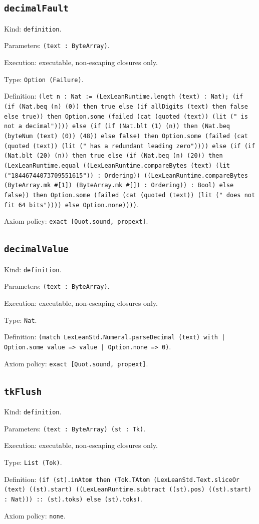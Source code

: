 \documentclass[11pt]{article}
\begin{document}
\subsection*{\texttt{decimalFault}}
\noindent Kind: \texttt{definition}.\par
\noindent Parameters: \texttt{(text : ByteArray)}.\par
\noindent Execution: executable, non-escaping closures only.\par
\noindent Type: \texttt{Option (Failure)}.\par
\noindent Definition: \texttt{(let n : Nat := (LexLeanRuntime.length (text) : Nat); (if (if (Nat.beq (n) (0)) then true else (if allDigits (text) then false else true)) then Option.some (failed (cat (quoted (text)) (lit (" is not a decimal")))) else (if (if (Nat.blt (1) (n)) then (Nat.beq (byteNum (text) (0)) (48)) else false) then Option.some (failed (cat (quoted (text)) (lit (" has a redundant leading zero")))) else (if (if (Nat.blt (20) (n)) then true else (if (Nat.beq (n) (20)) then (LexLeanRuntime.equal ((LexLeanRuntime.compareBytes (text) (lit ("18446744073709551615")) : Ordering)) ((LexLeanRuntime.compareBytes (ByteArray.mk \#[1]) (ByteArray.mk \#[]) : Ordering)) : Bool) else false)) then Option.some (failed (cat (quoted (text)) (lit (" does not fit 64 bits")))) else Option.none))))}.\par
\noindent Axiom policy: \texttt{exact [Quot.sound, propext]}.\par
\subsection*{\texttt{decimalValue}}
\noindent Kind: \texttt{definition}.\par
\noindent Parameters: \texttt{(text : ByteArray)}.\par
\noindent Execution: executable, non-escaping closures only.\par
\noindent Type: \texttt{Nat}.\par
\noindent Definition: \texttt{(match LexLeanStd.Numeral.parseDecimal (text) with | Option.some value => value | Option.none => 0)}.\par
\noindent Axiom policy: \texttt{exact [Quot.sound, propext]}.\par
\subsection*{\texttt{tkFlush}}
\noindent Kind: \texttt{definition}.\par
\noindent Parameters: \texttt{(text : ByteArray) (st : Tk)}.\par
\noindent Execution: executable, non-escaping closures only.\par
\noindent Type: \texttt{List (Tok)}.\par
\noindent Definition: \texttt{(if (st).inAtom then (Tok.TAtom (LexLeanStd.Text.sliceOr (text) ((st).start) ((LexLeanRuntime.subtract ((st).pos) ((st).start) : Nat))) :: (st).toks) else (st).toks)}.\par
\noindent Axiom policy: \texttt{none}.\par
\end{document}
